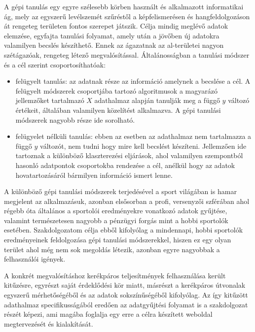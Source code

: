 \label{Chap:bevezetes}

A gépi tanulás egy egyre szélesebb körben használt és alkalmazott informatikai ág, mely az egyszerű levélszemét szűréstől a képfelismerésen és hangfeldolgozáson át rengeteg területen fontos szerepet játszik. Célja mindig meglévő adatok elemzése, egyfajta tanulási folyamat, amely után a jövőben új adatokra valamilyen becslés készíthető. Ennek az ágazatnak az al-területei nagyon szétágazóak, rengeteg létező megvalósítással. Általánosságban a tanulási módszer és a cél szerint csoportosíthatóak:
\begin{itemize}
	\item felügyelt tanulás: az adatnak része az információ amelynek a becslése a cél. A felügyelt módszerek csoportjába tartozó algoritmusok a magyarázó jellemzőket tartalmazó $X$ adathalmaz alapján tanulják meg a függő $y$ változó értékeit, általában valamilyen közelítést alkalmazva. A gépi tanulási módszerek nagyobb része ide sorolható.
	\item felügyelet nélküli tanulás: ebben az esetben az adathalmaz nem tartalmazza a függő $y$ változót, nem tudni hogy mire kell becslést készíteni. Jellemzően ide tartoznak a különböző klaszterezési eljárások, ahol valamilyen szempontból hasonló adatpontok csoportokba rendezése a cél, anélkül hogy az adatok hovatartozásáról bármilyen információ ismert lenne. 
\end{itemize}

A különböző gépi tanulási módszerek terjedésével a sport világában is hamar megjelent az alkalmazásuk, azonban elsősorban a profi, versenyzői szférában ahol régebb óta általános a sportolói eredményekre vonatkozó adatok gyűjtése, valamint természetesen nagyobb a pénzügyi forgás mint a hobbi sportolók esetében. Szakdolgozatom célja ebből kifolyólag a mindennapi, hobbi sportolók eredményeinek feldolgozása gépi tanulási módszerekkel, hiszen ez egy olyan terület ahol még nem sok megoldás létezik, azonban egyre nagyobbak a felhasználói igények.

A konkrét megvalósításhoz kerékpáros teljesítmények felhasználása került kitűzésre, egyrészt saját érdeklődési kör miatt, másrészt a kerékpáros útvonalak egyszerű mérhetőségéből és az adatok sokszínűségéből kifolyólag. Az így kitűzött adathalmaz specifikusságából eredően az adatgyűjtési folyamat is a szakdolgozat részét képezi, ami magába foglalja egy erre a célra készített weboldal megtervezését és kialakítását.






